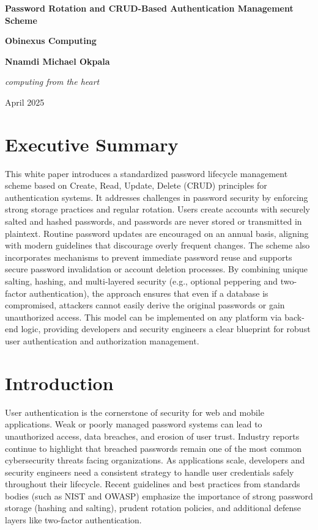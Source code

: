 \documentclass[11pt]{article}
\begin{document}
\begin{titlepage}
    \centering
    {\LARGE \textbf{Password Rotation and CRUD-Based Authentication Management Scheme}\par}
    \vspace{1cm}
    {\large \textbf{Obinexus Computing} \par}
    {\large \textbf{Nnamdi Michael Okpala}\par}
    \vspace{0.5cm}
    {\itshape computing from the heart\par}
    \vfill
    {\large April 2025\par}
\end{titlepage}

\section*{Executive Summary}
This white paper introduces a standardized password lifecycle management scheme based on Create, Read, Update, Delete (CRUD) principles for authentication systems. It addresses challenges in password security by enforcing strong storage practices and regular rotation. Users create accounts with securely salted and hashed passwords, and passwords are never stored or transmitted in plaintext. Routine password updates are encouraged on an annual basis, aligning with modern guidelines that discourage overly frequent changes. The scheme also incorporates mechanisms to prevent immediate password reuse and supports secure password invalidation or account deletion processes. By combining unique salting, hashing, and multi-layered security (e.g., optional peppering and two-factor authentication), the approach ensures that even if a database is compromised, attackers cannot easily derive the original passwords or gain unauthorized access. This model can be implemented on any platform via back-end logic, providing developers and security engineers a clear blueprint for robust user authentication and authorization management.

\section{Introduction}
User authentication is the cornerstone of security for web and mobile applications. Weak or poorly managed password systems can lead to unauthorized access, data breaches, and erosion of user trust. Industry reports continue to highlight that breached passwords remain one of the most common cybersecurity threats facing organizations. As applications scale, developers and security engineers need a consistent strategy to handle user credentials safely throughout their lifecycle. Recent guidelines and best practices from standards bodies (such as NIST and OWASP) emphasize the importance of strong password storage (hashing and salting), prudent rotation policies, and additional defense layers like two-factor authentication. 
\end{document}
